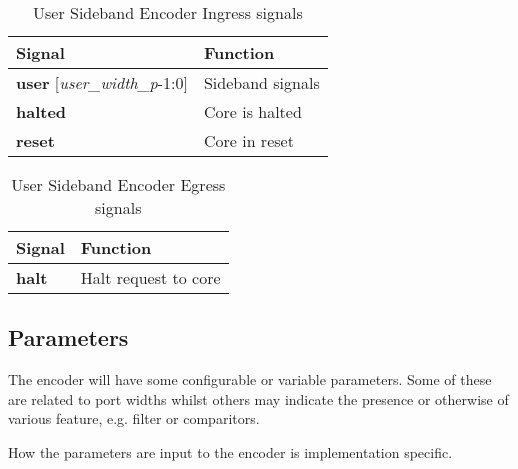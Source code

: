 \begin{table}[htp]
    \centering
    \caption{User Sideband Encoder Ingress signals}
    \label{tab:ingress-side-band}
    \begin{tabulary}{\textwidth}{|l|l|}
        \hline
        \textbf {Signal} & \textbf {Function} \\
       \hline
        \textbf {user} [\textit{user\_width\_p}-1:0] &  Sideband signals \\
        \hline
        \textbf {halted}& Core is halted \\
        \hline
        \textbf {reset}& Core in reset \\
        \hline
    \end{tabulary}
\end{table}

\begin{table}[htp]
    \centering
    \caption{User Sideband Encoder Egress signals}
    \label{tab:ingress-side-band}
    \begin{tabulary}{\textwidth}{|l|l|}
        \hline
        \textbf {Signal} & \textbf {Function} \\
        \hline
        \textbf {halt}& Halt request to core \\
        \hline
    \end{tabulary}
\end{table}


\subsection {Parameters}

The encoder will have some configurable or variable parameters. Some of these are related to port widths whilst others may indicate the presence or otherwise of various feature, e.g. filter or comparitors.

How the parameters are input to the encoder is implementation specific.  

